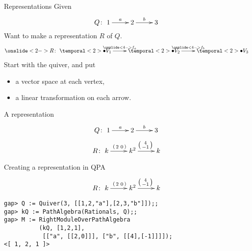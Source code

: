 \documentclass[usenames,dvipsnames]{beamer}
\begin{document}
\begin{frame}{Representations}
Given
\[
Q \colon
\xymatrix{1 \ar[r]^a & 2 \ar[r]^b & 3}
\]
Want to make a representation $R$ of $Q$.
\[
\onslide<2->{R \colon}
\xymatrix{
\temporal<2>{}{\bullet}{V_1} \ar[r]^{\onslide<4->{f_a}} &
\temporal<2>{}{\bullet}{V_2} \ar[r]^{\onslide<4->{f_b}} &
\temporal<2>{}{\bullet}{V_3}
}
\]
Start with the quiver, and put
\begin{itemize}
\item a vector space at each vertex,
\item a linear transformation on each arrow.
\end{itemize}
\end{frame}

\begin{frame}{A representation}
\Large
\[
Q \colon
\xymatrix{1 \ar[r]^a & 2 \ar[r]^b & 3}
\]
\vspace{.5em}
\[
R \colon
\xymatrix{
k   \ar[r]^{\left( \begin{smallmatrix} 2 & 0 \end{smallmatrix} \right)} &
k^2 \ar[r]^{\left( \begin{smallmatrix} 4 \\ -1 \end{smallmatrix} \right)} &
k
}
\]
\end{frame}

\begin{frame}[fragile]{Creating a representation in QPA}
\[
R \colon
\xymatrix{
k   \ar[r]^{\left( \begin{smallmatrix} 2 & 0 \end{smallmatrix} \right)} &
k^2 \ar[r]^{\left( \begin{smallmatrix} 4 \\ -1 \end{smallmatrix} \right)} &
k
}
\]
\begin{verbatim}
gap> Q := Quiver(3, [[1,2,"a"],[2,3,"b"]]);;
gap> kQ := PathAlgebra(Rationals, Q);;
gap> M := RightModuleOverPathAlgebra
          (kQ, [1,2,1],
           [["a", [[2,0]]], ["b", [[4],[-1]]]]);
<[ 1, 2, 1 ]>
\end{verbatim}
\end{frame}
\end{document}
